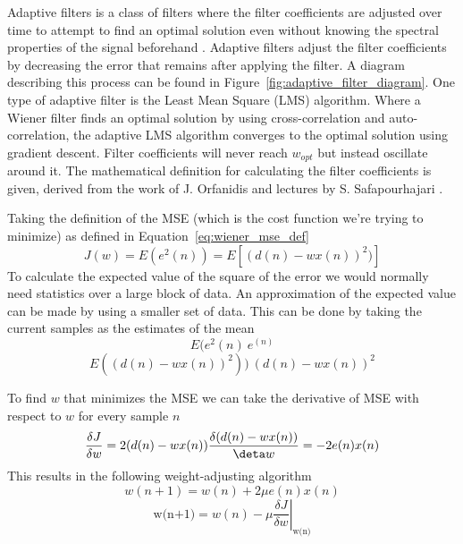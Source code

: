 Adaptive filters is a class of filters where the filter coefficients are adjusted over time to attempt to find an optimal solution even without knowing the spectral properties of the signal beforehand \cite{adaptive_filter_and_applications}. Adaptive filters adjust the filter coefficients by decreasing the error that remains after applying the filter. A diagram describing this process can be found in Figure~\ref{fig:adaptive_filter_diagram}. 
One type of adaptive filter is the Least Mean Square (LMS) algorithm. Where a Wiener filter finds an optimal solution by using cross-correlation and auto-correlation, the adaptive LMS algorithm converges to the optimal solution using gradient descent. Filter coefficients will never reach $w_{opt}$ but instead oscillate around it. The mathematical definition for calculating the filter coefficients is given, derived from the work of J. Orfanidis \cite[Ch. 7.3]{introduction_optimal_signal_processing} and lectures by S. Safapourhajari \cite{lecture_adaptive_filters_2}.

Taking the definition of the MSE (which is the cost function we're trying to minimize) as defined in Equation~\ref{eq:wiener_mse_def}
\begin{equation}
    J(w) = E(e^2(n)) = E[(d(n) - wx(n))^2)]
\end{equation}
To calculate the expected value of the square of the error we would normally need statistics over a large block of data. An approximation of the expected value can be made by using a smaller set of data. This can be done by taking the current samples as the estimates of the mean
\begin{equation}
    E(e^2(n) ~ e^(n)
\end{equation}
\begin{equation}
    E((d(n) - wx(n))^2)) ~ (d(n) - wx(n))^2
\end{equation}

To find $w$ that minimizes the MSE we can take the derivative of MSE with respect to $w$ for every sample $n$
\begin{equation}
    \frac{\delta J}{\delta w} = 2(d(n) - wx(n)) \frac{\delta(d(n) - wx(n))}{\deta w} = -2e(n)x(n)
\end{equation}
This results in the following weight-adjusting algorithm
\begin{equation}
   w(n+1) = w(n) + 2 \mu e(n)x(n)
\end{equation}
\begin{equation}
    \textrm{w(n+1)}=\left.w(n)-\mu \frac{\delta J}{\delta w}\right\rvert_{\textrm{w(n)}}
\end{equation}


